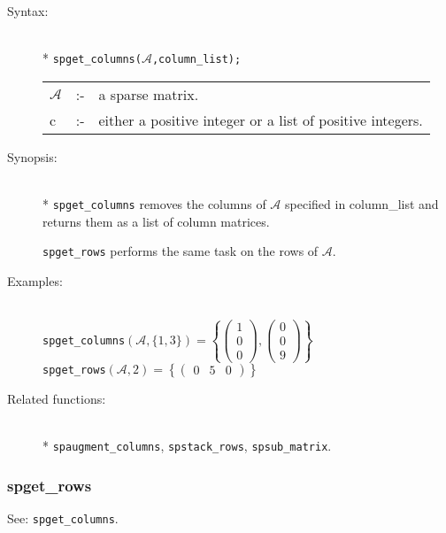 \begin{description}
\item[Syntax:]\mbox{}\\*
\texttt{spget\_columns($\mathcal{A}$,column\_list);}\\[2mm]
\begin{tabular}{l l l}
$\mathcal{A}$ &:-& a sparse matrix. \\
c          &:-& either a positive integer or a list of positive
                integers.
\end{tabular}

\item[Synopsis:]\mbox{}\\*
\texttt{spget\_columns} removes the columns of $\mathcal{A}$ specified in
                column\_list and returns them as a list of column
                matrices.

 \texttt{spget\_rows} performs the same task on the rows of
                $\mathcal{A}$.

\item[Examples:]\mbox{}\\
\texttt{spget\_columns}\((\mathcal{A},\{1,3\})  =
\left\{
        \begin{pmatrix} 1 \\ 0 \\ 0 \end{pmatrix},
        \begin{pmatrix} 0 \\ 0 \\ 9 \end{pmatrix}
\right\}\) \\[2mm]
\texttt{spget\_rows}\((\mathcal{A},2) =
\left\{
        \begin{pmatrix} 0 & 5 & 0 \end{pmatrix}
\right\}\)

\item[Related functions:]\mbox{}\\*
\texttt{spaugment\_columns}, \texttt{spstack\_rows},
\texttt{spsub\_matrix}.

\end{description}

\subsubsection{spget\_rows}
\label{sparse:spget_rows}
\hypertarget{operator:SPGET_ROWS}{}
See: \texttt{spget\_columns}.


